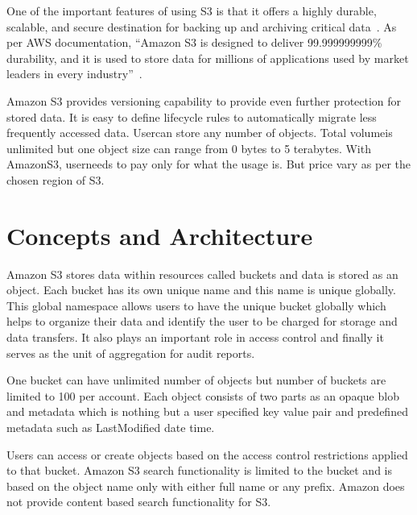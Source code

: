 One of the important features of using S3 is that it offers a highly
durable, scalable, and secure destination for backing up and archiving
critical data~\cite{hid-sp18-420-amazon-S3}. As per AWS documentation,
``Amazon S3 is designed to deliver 99.999999999\% durability, and it
is used to store data for millions of applications used by market
leaders in every industry''~\cite{hid-sp18-420-amazon-S3}.

Amazon S3 provides versioning capability to provide\GE{} even further protection for stored data. It is
easy to
define lifecycle rules to automatically migrate less frequently
accessed data. User\GE can store any number of objects. Total
volume\GE is unlimited but one object size can range from 0
bytes to 5 terabytes. With AmazonS3, user\GE needs to pay only for
what the usage is. But price
vary as per the chosen region of S3.



\section{Concepts and Architecture}

Amazon S3 stores data within resources called buckets and data is
stored as an object. Each bucket has its own
unique name and this name is unique globally.  This global namespace allows users to have the unique
bucket globally which helps to organize their data and identify the
user to be charged for storage and data transfers. It
also plays an important role in access control and finally it serves as the unit of aggregation for audit reports.


One bucket can have unlimited number of objects but number of buckets are limited to 100 per
account. Each object consists of two parts as an opaque blob and
metadata which is nothing but a user specified key value
pair and predefined metadata such as LastModified date time.


Users can access or create objects based on the access control
restrictions applied to that bucket. Amazon S3  search functionality is limited to the bucket
 and is based on the object name
only with either full name or any prefix.  Amazon does not provide
content based search functionality for S3.



